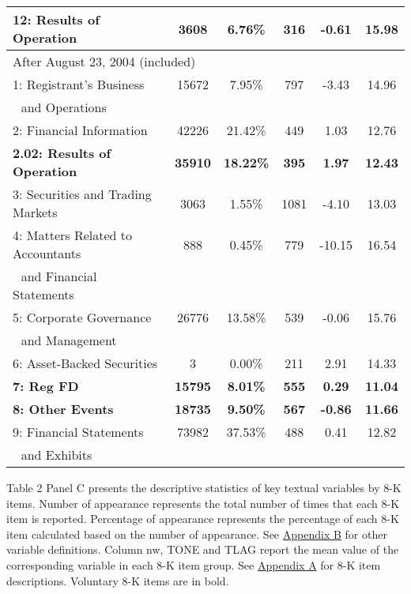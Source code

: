 \begin{table}[H]
\begin{center}
\begin{tabular}{lccccc}
  		\textbf{12: Results of Operation} & \textbf{3608} & \textbf{6.76\%} & \textbf{316} & \textbf{-0.61} & \textbf{15.98} \\
  		\midrule
  		\multicolumn{6}{l}{After August 23, 2004 (included)} \\
  		\midrule
  		1: Registrant's Business & 15672 & 7.95\% & 797 & -3.43 & 14.96 \\
  		\: \,\, and Operations & &  &  &  & \\
  		2: Financial Information & 42226 & 21.42\% & 449 & 1.03 & 12.76 \\
  		\textbf{2.02: Results of Operation} & \textbf{35910} & \textbf{18.22\%} & \textbf{395} & \textbf{1.97} & \textbf{12.43} \\
  		3: Securities and Trading Markets & 3063 & 1.55\% & 1081 & -4.10 & 13.03 \\
  		4: Matters Related to Accountants & 888 & 0.45\% & 779 & -10.15 & 16.54 \\
  		\: \,\, and Financial Statements & &  &  &  & \\
  		5: Corporate Governance & 26776 & 13.58\% & 539 & -0.06 & 15.76 \\
  		\: \,\, and Management & &  &  &  & \\
  		6: Asset-Backed Securities & 3 & 0.00\% & 211 & 2.91 & 14.33 \\
  		\textbf{7: Reg FD} & \textbf{15795} & \textbf{8.01\%} & \textbf{555} & \textbf{0.29} & \textbf{11.04} \\
  		\textbf{8: Other Events} & \textbf{18735} & \textbf{9.50\%} & \textbf{567} & \textbf{-0.86} & \textbf{11.66} \\
  		9: Financial Statements & 73982 & 37.53\% & 488 & 0.41 & 12.82 \\
  		\: \,\, and Exhibits & &  &  &  & \\
  		\bottomrule
  		\bottomrule
  	\end{tabular}%
  \end{center}
	\begin{footnotesize}
		\noindent Table 2 Panel C presents the descriptive statistics of key textual variables by 8-K items. Number of appearance represents the total number of times that each 8-K item is reported. Percentage of appearance represents the percentage of each 8-K item calculated based on the number of appearance. See \hyperref[appb]{Appendix B} for other variable definitions. Column nw, TONE and TLAG report the mean value of the corresponding variable in each 8-K item group. See \hyperref[appa]{Appendix A} for 8-K item descriptions. Voluntary 8-K items are in bold.
	\end{footnotesize}
\end{table}%
